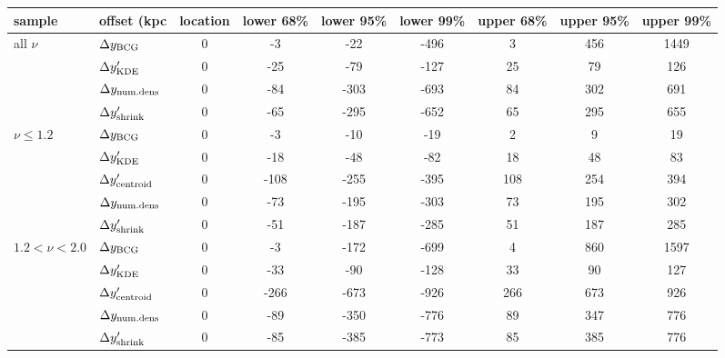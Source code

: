 \begin{tabular}{llccccccc}
\toprule
sample & offset (kpc  &  location &  lower 68\% &  lower 95\% &  lower 99\% &  upper 68\% &  upper 95\% &  upper 99\% \\
\midrule
all $\nu$& $\Delta y_{\rm BCG}$                &         0 &          -3 &         -22 &        -496 &           3 &         456 &        1449 \\
& $\Delta y_{\rm KDE}'$               &         0 &         -25 &         -79 &        -127 &          25 &          79 &         126 \\
& $\Delta y_{\rm num. dens}$          &        0 &         -84 &        -303 &        -693 &          84 &         302 &         691 \\
& $\Delta y_{\rm shrink}'$            &        0 &         -65 &        -295 &        -652 &          65 &         295 &         655 \\
\midrule
$\nu \leq 1.2$& $\Delta y_{\rm BCG}$              &        0 &          -3 &         -10 &         -19 &           2 &           9 &          19 \\
& $\Delta y_{\rm KDE}'$             &         0 &         -18 &         -48 &         -82 &          18 &          48 &          83 \\
& $\Delta y_{\rm centroid}'$         &        0 &        -108 &        -255 &        -395 &         108 &         254 &         394 \\
& $\Delta y_{\rm num. dens}$        &        0 &         -73 &        -195 &        -303 &          73 &         195 &         302 \\
& $\Delta y_{\rm shrink}'$          &         0 &         -51 &        -187 &        -285 &          51 &         187 &         285 \\
\midrule
$1.2 < \nu < 2.0$& $\Delta y_{\rm BCG}$        &         0 &          -3 &        -172 &        -699 &           4 &         860 &        1597 \\
& $\Delta y_{\rm KDE}'$       &        0 &         -33 &         -90 &        -128 &          33 &          90 &         127 \\
& $\Delta y_{\rm centroid}'$   &         0 &        -266 &        -673 &        -926 &         266 &         673 &         926 \\
& $\Delta y_{\rm num. dens}$  &         0 &         -89 &        -350 &        -776 &          89 &         347 &         776 \\
& $\Delta y_{\rm shrink}'$    &        0 &         -85 &        -385 &        -773 &          85 &         385 &         776 \\
\bottomrule
\end{tabular}
